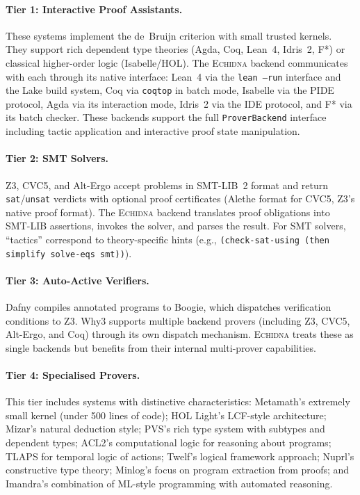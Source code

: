 \documentclass[11pt,a4paper]{article}
\newcommand{\echidna}{\textsc{Echidna}}
\newcommand{\proverbackend}{\texttt{ProverBackend}}
\begin{document}
\paragraph{Tier 1: Interactive Proof Assistants.}
These systems implement the de~Bruijn criterion with small trusted kernels.
They support rich dependent type theories (Agda, Coq, Lean~4, Idris~2, F*)
or classical higher-order logic (Isabelle/HOL). The \echidna{} backend
communicates with each through its native interface: Lean~4 via the
\texttt{lean --run} interface and the Lake build system, Coq via
\texttt{coqtop} in batch mode, Isabelle via the PIDE protocol, Agda via its
interaction mode, Idris~2 via the IDE protocol, and F* via its batch checker.
These backends support the full \proverbackend{} interface including tactic
application and interactive proof state manipulation.

\paragraph{Tier 2: SMT Solvers.}
Z3, CVC5, and Alt-Ergo accept problems in SMT-LIB~2 format and return
\texttt{sat}/\texttt{unsat} verdicts with optional proof certificates (Alethe
format for CVC5, Z3's native proof format). The \echidna{} backend translates
proof obligations into SMT-LIB assertions, invokes the solver, and parses the
result. For SMT solvers, ``tactics'' correspond to theory-specific hints
(e.g., \texttt{(check-sat-using (then simplify solve-eqs smt))}).

\paragraph{Tier 3: Auto-Active Verifiers.}
Dafny compiles annotated programs to Boogie, which dispatches verification
conditions to Z3. Why3 supports multiple backend provers (including Z3, CVC5,
Alt-Ergo, and Coq) through its own dispatch mechanism. \echidna{} treats these
as single backends but benefits from their internal multi-prover capabilities.

\paragraph{Tier 4: Specialised Provers.}
This tier includes systems with distinctive characteristics: Metamath's
extremely small kernel (under 500 lines of code); HOL Light's LCF-style
architecture; Mizar's natural deduction style; PVS's rich type system with
subtypes and dependent types; ACL2's computational logic for reasoning about
programs; TLAPS for temporal logic of actions; Twelf's logical framework
approach; Nuprl's constructive type theory; Minlog's focus on program
extraction from proofs; and Imandra's combination of ML-style programming
with automated reasoning.
\end{document}
